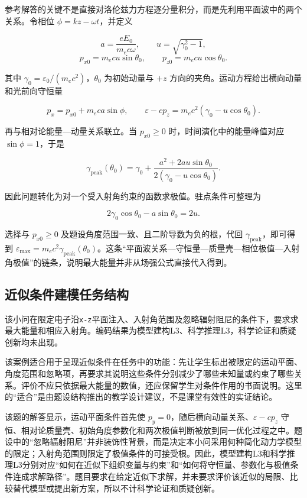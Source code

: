 \documentclass[
  12pt,
  a4paper,twoside,openany]{ctexbook}
\begin{document}
参考解答的关键不是直接对洛伦兹力方程逐分量积分，而是先利用平面波中的两个关系。令相位
\(\phi=kz-\omega t\)，并定义

\[
a=\frac{eE_0}{m_ec\omega},\qquad
u=\sqrt{\gamma_0^2-1},
\]
\[
p_{x0}=m_ecu\sin\theta_0,\qquad
p_{z0}=m_ecu\cos\theta_0.
\]

其中 \(\gamma_0=\varepsilon_0/(m_ec^2)\)，\(\theta_0\) 为初始动量与
\(+z\) 方向的夹角。运动方程给出横向动量和光前向守恒量

\[
p_x=p_{x0}+m_eca\sin\phi,
\qquad
\varepsilon-cp_z
=m_ec^2\!\left(\gamma_0-u\cos\theta_0\right).
\]

再与相对论能量---动量关系联立。当 \(p_{x0}\geq0\)
时，时间演化中的能量峰值对应 \(\sin\phi=1\)，于是

\[
\gamma_{\mathrm{peak}}(\theta_0)
=\gamma_0+
\frac{a^2+2au\sin\theta_0}
{2\!\left(\gamma_0-u\cos\theta_0\right)}.
\]

因此问题转化为对一个受入射角约束的函数求极值。驻点条件可整理为

\[
2\gamma_0\cos\theta_0-a\sin\theta_0=2u.
\]

选择与 \(p_{x0}\geq0\) 及题设角度范围一致、且二阶导数为负的根，代回
\(\gamma_{\mathrm{peak}}\)，即可得到
\(\varepsilon_{\max}=m_ec^2\gamma_{\mathrm{peak}}(\theta_0)\)。这条``平面波关系---守恒量---质量壳---相位极值---入射角极值''的链条，说明最大能量并非从场强公式直接代入得到。

\subsection{近似条件建模任务结构}\label{ux8fd1ux4f3cux6761ux4ef6ux5efaux6a21ux4efbux52a1ux7ed3ux6784}

该小问在限定电子沿\texttt{x-z}平面注入、入射角范围及忽略辐射阻尼的条件下，要求求最大能量和相应入射角。编码结果为模型建构L3、科学推理L3，科学论证和质疑创新均未出现。

该案例适合用于呈现近似条件在任务中的功能：先让学生标出被限定的运动平面、角度范围和忽略项，再要求其说明这些条件分别减少了哪些未知量或约束了哪些关系。评价不应只依据最大能量的数值，还应保留学生对条件作用的书面说明。这里的``适合''是由题设结构推出的教学设计建议，不是课堂有效性的实证结论。

该题的解答显示，运动平面条件首先使
\(p_y=0\)，随后横向动量关系、\(\varepsilon-cp_z\)
守恒、相对论质量壳、初始角度参数化和两次极值判断被放到同一优化过程之中。题设中的``忽略辐射阻尼''并非装饰性背景，而是决定本小问采用何种简化动力学模型的限定；入射角范围则限定了极值条件的可接受根。因此，模型建构L3和科学推理L3分别对应``如何在近似下组织变量与约束''和``如何将守恒量、参数化与极值条件连成求解路径''。题目要求在给定近似下求解，并未要求评价该近似的局限、比较替代模型或提出新方案，所以不计科学论证和质疑创新。
\end{document}
